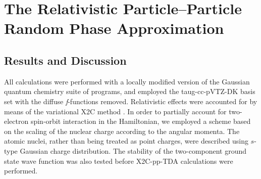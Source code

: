 \section{The Relativistic Particle--Particle Random Phase Approximation}



\subsection{Results and Discussion}
\label{sec:Results}

All calculations were performed with a locally modified version of the Gaussian quantum chemistry suite of programs,\cite{GDVI06}
and employed the taug-cc-pVTZ-DK basis set\cite{Dixon01_48} with the diffuse \emph{f}-functions removed.
Relativistic effects were accounted for by means of the variational X2C method .\cite{Reiher13_184105,Saue11_3077,Liu09_219,Liu10_532,Liu09_1945}
In order to partially account for two-electron spin-orbit interaction in the Hamiltonian, we employed a scheme based on the scaling of the nuclear charge according to the angular momenta.\cite{Boettger00_7809}
The atomic nuclei, rather than being treated as point charges, were described using $s$-type Gaussian charge distribution.\cite{Dyall97_207,Saue98_920}
The stability of the two-component ground state wave function was also tested before X2C-pp-TDA calculations were performed.\cite{Li15_154109}


